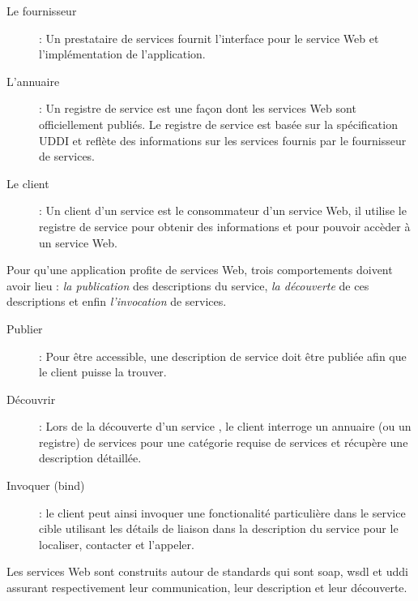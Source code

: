 

\renewcommand{\descriptionlabel}[1]{\hspace{1cm}\textbullet~\textsf{#1}}
\begin{description}
\item[Le fournisseur]: Un prestataire de services fournit l'interface
  pour le service Web et l'implémentation de l'application.

\item[L'annuaire]: Un registre de service est une façon dont les
  services Web sont officiellement publiés. Le registre de service est
  basée sur la spécification \textsc{UDDI} et reflète des informations
  sur les services fournis par le fournisseur de services.

\item[Le client]: Un client d'un service est le consommateur d'un
  service Web, il utilise le registre de service pour obtenir des
  informations et pour pouvoir accèder à un service Web.
\end{description}

Pour qu'une application profite de services Web, trois comportements
doivent avoir lieu : \textit{la publication} des descriptions du
service, \textit{la découverte} de ces descriptions et enfin
\textit{l'invocation} de services.

\renewcommand{\descriptionlabel}[1]{\hspace{1cm}\textbullet~\textsf{#1}}
\begin{description}
\item[Publier]: Pour être accessible, une description de service doit
  être publiée afin que le client puisse la trouver.

\item[Découvrir]: Lors de la découverte d'un service , le client
  interroge un annuaire (ou un registre) de services pour une
  catégorie requise de services et récupère une description
  détaillée.

\item[Invoquer (bind)]: le client peut ainsi invoquer une
  fonctionalité particulière dans le service cible utilisant les
  détails de liaison dans la description du service pour le localiser,
  contacter et l'appeler.
\end{description}

Les services Web sont construits autour de standards qui sont
\acrshort{soap}, \acrshort{wsdl} et \acrshort{uddi} assurant
respectivement leur communication, leur description et leur
découverte.

